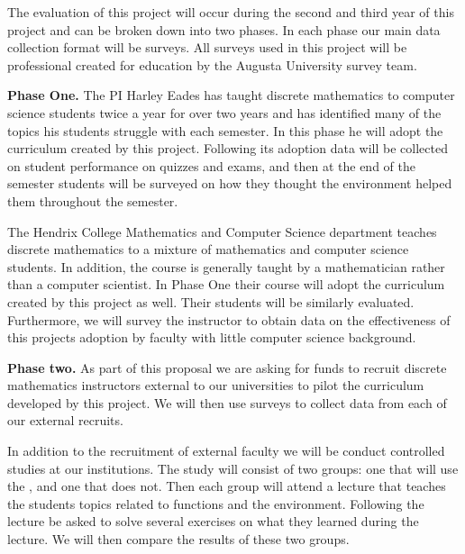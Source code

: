 The evaluation of this project will occur during the second and third
year of this project and can be broken down into two phases.  In each
phase our main data collection format will be surveys.  All surveys
used in this project will be professional created for education by the
Augusta University survey team.

\textbf{Phase One.} The PI Harley Eades has taught discrete
mathematics to computer science students twice a year for over two
years and has identified many of the topics his students struggle with
each semester.  In this phase he will adopt the curriculum created by
this project.  Following its adoption data will be collected on
student performance on quizzes and exams, and then at the end of the
semester students will be surveyed on how they thought the \thelang{}
environment helped them throughout the semester.

The Hendrix College Mathematics and Computer Science department
teaches discrete mathematics to a mixture of mathematics and computer
science students.  In addition, the course is generally taught by a
mathematician rather than a computer scientist.  In Phase One their
course will adopt the curriculum created by this project as well.
Their students will be similarly evaluated.  Furthermore, we will
survey the instructor to obtain data on the effectiveness of this
projects adoption by faculty with little computer science background.

\textbf{Phase two.} As part of this proposal we are asking for funds
to recruit discrete mathematics instructors external to our
universities to pilot the curriculum developed by this project. We
will then use surveys to collect data from each of our external
recruits.

In addition to the recruitment of external faculty we will be conduct
controlled studies at our institutions.  The study will consist of two
groups: one that will use the \thelang{}, and one that does not.  Then
each group will attend a lecture that teaches the students topics
related to functions and the \thelang{} environment.  Following the
lecture be asked to solve several exercises on what they learned
during the lecture.  We will then compare the results of these two
groups.  
